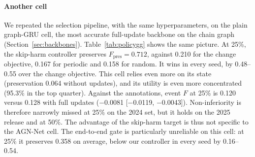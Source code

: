 \ifgg
\paragraph*{Another cell}
\label{sec:gg}
We repeated the selection pipeline, with the same hyperparameters, on the plain graph-GRU cell, the most accurate full-update backbone on the chain graph (Section~\ref{sec:backbones}). Table~\ref{tab:policygg} shows the same picture. At 25\%, the skip-harm controller preserves $F_{\mathrm{pres}}=0.712$, against 0.210 for the change objective, 0.167 for periodic and 0.158 for random. It wins in every seed, by 0.48--0.55 over the change objective. This cell relies even more on its state (preservation 0.064 without updates), and its utility is even more concentrated (95.3\% in the top quarter). Against the annotations, event $F$ at 25\% is 0.120 versus 0.128 with full updates (\ensuremath{-}0.0081 [\ensuremath{-}0.0119, \ensuremath{-}0.0043]). Non-inferiority is therefore narrowly missed at 25\% on the 2024 set, but it holds on the 2025 release and at 50\%. The advantage of the skip-harm target is thus not specific to the AGN-Net cell. The end-to-end gate is particularly unreliable on this cell: at 25\% it preserves 0.358 on average, below our controller in every seed by 0.16--0.54.

\fi

